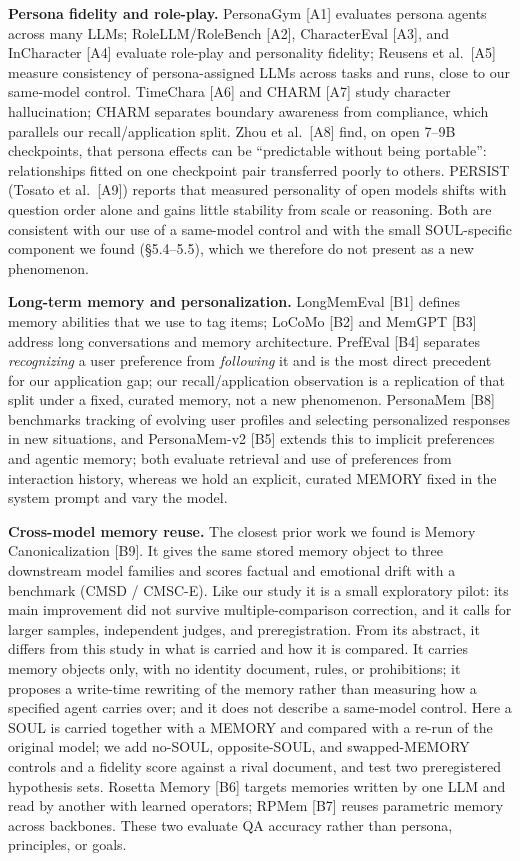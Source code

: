 \documentclass[10pt]{article}
\begin{document}
\textbf{Persona fidelity and role-play.} PersonaGym {[}A1{]} evaluates persona agents across many LLMs; RoleLLM/RoleBench {[}A2{]}, CharacterEval {[}A3{]}, and InCharacter {[}A4{]} evaluate role-play and personality fidelity; Reusens et al.~{[}A5{]} measure consistency of persona-assigned LLMs across tasks and runs, close to our same-model control. TimeChara {[}A6{]} and CHARM {[}A7{]} study character hallucination; CHARM separates boundary awareness from compliance, which parallels our recall/application split. Zhou et al.~{[}A8{]} find, on open 7--9B checkpoints, that persona effects can be ``predictable without being portable'': relationships fitted on one checkpoint pair transferred poorly to others. PERSIST (Tosato et al.~{[}A9{]}) reports that measured personality of open models shifts with question order alone and gains little stability from scale or reasoning. Both are consistent with our use of a same-model control and with the small SOUL-specific component we found (§5.4--5.5), which we therefore do not present as a new phenomenon.

\textbf{Long-term memory and personalization.} LongMemEval {[}B1{]} defines memory abilities that we use to tag items; LoCoMo {[}B2{]} and MemGPT {[}B3{]} address long conversations and memory architecture. PrefEval {[}B4{]} separates \emph{recognizing} a user preference from \emph{following} it and is the most direct precedent for our application gap; our recall/application observation is a replication of that split under a fixed, curated memory, not a new phenomenon. PersonaMem {[}B8{]} benchmarks tracking of evolving user profiles and selecting personalized responses in new situations, and PersonaMem-v2 {[}B5{]} extends this to implicit preferences and agentic memory; both evaluate retrieval and use of preferences from interaction history, whereas we hold an explicit, curated MEMORY fixed in the system prompt and vary the model.

\textbf{Cross-model memory reuse.} The closest prior work we found is Memory Canonicalization {[}B9{]}. It gives the same stored memory object to three downstream model families and scores factual and emotional drift with a benchmark (CMSD / CMSC-E). Like our study it is a small exploratory pilot: its main improvement did not survive multiple-comparison correction, and it calls for larger samples, independent judges, and preregistration. From its abstract, it differs from this study in what is carried and how it is compared. It carries memory objects only, with no identity document, rules, or prohibitions; it proposes a write-time rewriting of the memory rather than measuring how a specified agent carries over; and it does not describe a same-model control. Here a SOUL is carried together with a MEMORY and compared with a re-run of the original model; we add no-SOUL, opposite-SOUL, and swapped-MEMORY controls and a fidelity score against a rival document, and test two preregistered hypothesis sets. Rosetta Memory {[}B6{]} targets memories written by one LLM and read by another with learned operators; RPMem {[}B7{]} reuses parametric memory across backbones. These two evaluate QA accuracy rather than persona, principles, or goals.
\end{document}
